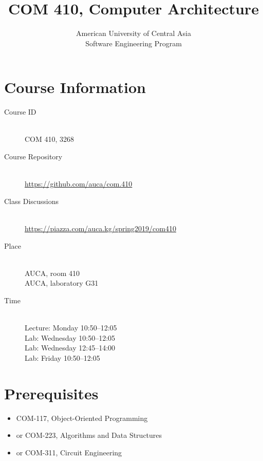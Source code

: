 \documentclass[12pt,a4paper,oneside]{article}
\begin{document}
    \title{COM 410, Computer Architecture}
    \author{
        American University of Central Asia\\
        Software Engineering Program
    }
    \date{}
    \maketitle

    \section{Course Information}

        \begin{description}
            \item[Course ID]\hfill\\
                COM 410, 3268
            \item[Course Repository]\hfill\\
                \url{https://github.com/auca/com.410}
            \item[Class Discussions]\hfill\\
                \url{https://piazza.com/auca.kg/spring2019/com410}
            \item[Place]\hfill\\
                AUCA, room 410\\
                AUCA, laboratory G31
            \item[Time]\hfill\\
                Lecture: Monday 10:50--12:05\\
                Lab: Wednesday 10:50--12:05\\
                Lab: Wednesday 12:45--14:00\\
                Lab: Friday 10:50--12:05
        \end{description}

    \section{Prerequisites}

        \begin{itemize}
            \item COM-117, Object-Oriented Programming
            \item or COM-223, Algorithms and Data Structures
            \item or COM-311, Circuit Engineering
        \end{itemize}
\end{document}

